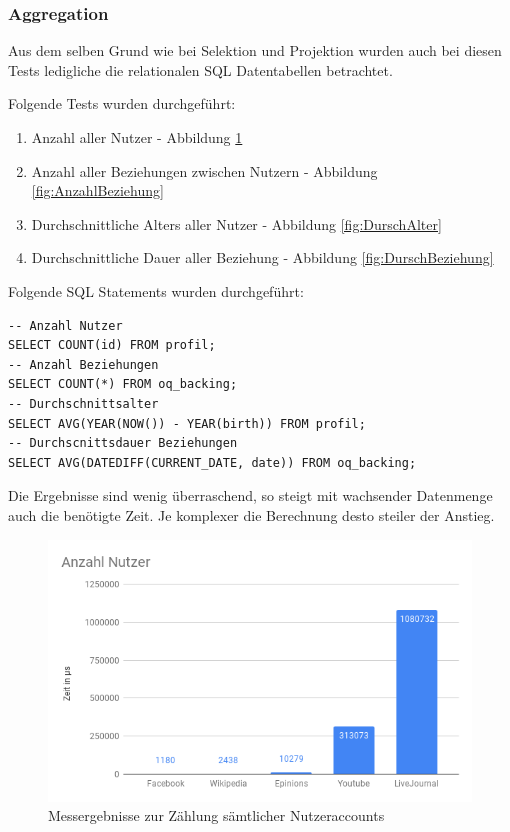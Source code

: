 \subsubsection{Aggregation}
Aus dem selben Grund wie bei Selektion und Projektion wurden auch bei diesen Tests ledigliche die relationalen SQL Datentabellen betrachtet.

Folgende Tests wurden durchgeführt:
\begin{enumerate}
	\item Anzahl aller Nutzer - Abbildung \ref{fig:AnzahlNutzer}
	\item Anzahl aller Beziehungen zwischen Nutzern - Abbildung \ref{fig:AnzahlBeziehung}
	\item Durchschnittliche Alters aller Nutzer - Abbildung \ref{fig:DurschAlter}
	\item Durchschnittliche Dauer aller Beziehung - Abbildung \ref{fig:DurschBeziehung}
\end{enumerate}

Folgende SQL Statements wurden durchgeführt:
\begin{lstlisting}
-- Anzahl Nutzer
SELECT COUNT(id) FROM profil;
-- Anzahl Beziehungen
SELECT COUNT(*) FROM oq_backing;
-- Durchschnittsalter
SELECT AVG(YEAR(NOW()) - YEAR(birth)) FROM profil;
-- Durchscnittsdauer Beziehungen
SELECT AVG(DATEDIFF(CURRENT_DATE, date)) FROM oq_backing;
\end{lstlisting}

Die Ergebnisse sind wenig überraschend, so steigt mit wachsender Datenmenge auch die benötigte Zeit. Je komplexer die Berechnung desto steiler der Anstieg.

\begin{figure}
	\centering
	\includegraphics[width=\textwidth]{images/AnzahlNutzer.png}
	\caption{Messergebnisse zur Zählung sämtlicher Nutzeraccounts}
	\label{fig:AnzahlNutzer}
\end{figure}

